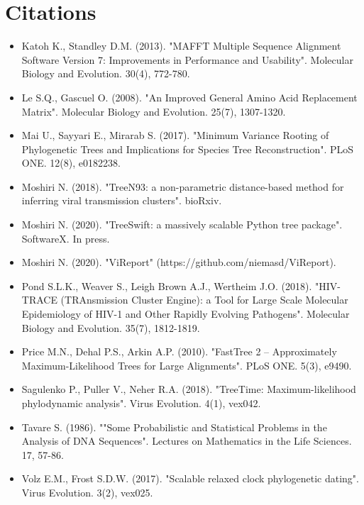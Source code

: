 \documentclass{article}
\begin{document}
\section{Citations}
\begin{itemize}
\item Katoh K., Standley D.M. (2013). "MAFFT Multiple Sequence Alignment Software Version 7: Improvements in Performance and Usability". Molecular Biology and Evolution. 30(4), 772-780.\item Le S.Q., Gascuel O. (2008). "An Improved General Amino Acid Replacement Matrix". Molecular Biology and Evolution. 25(7), 1307-1320.\item Mai U., Sayyari E., Mirarab S. (2017). "Minimum Variance Rooting of Phylogenetic Trees and Implications for Species Tree Reconstruction". PLoS ONE. 12(8), e0182238.\item Moshiri N. (2018). "TreeN93: a non-parametric distance-based method for inferring viral transmission clusters". bioRxiv.\item Moshiri N. (2020). "TreeSwift: a massively scalable Python tree package". SoftwareX. In press.\item Moshiri N. (2020). "ViReport" (https://github.com/niemasd/ViReport).\item Pond S.L.K., Weaver S., Leigh Brown A.J., Wertheim J.O. (2018). "HIV-TRACE (TRAnsmission Cluster Engine): a Tool for Large Scale Molecular Epidemiology of HIV-1 and Other Rapidly Evolving Pathogens". Molecular Biology and Evolution. 35(7), 1812-1819.\item Price M.N., Dehal P.S., Arkin A.P. (2010). "FastTree 2 -- Approximately Maximum-Likelihood Trees for Large Alignments". PLoS ONE. 5(3), e9490.\item Sagulenko P., Puller V., Neher R.A. (2018). "TreeTime: Maximum-likelihood phylodynamic analysis". Virus Evolution. 4(1), vex042.\item Tavare S. (1986). ""Some Probabilistic and Statistical Problems in the Analysis of DNA Sequences". Lectures on Mathematics in the Life Sciences. 17, 57-86.\item Volz E.M., Frost S.D.W. (2017). "Scalable relaxed clock phylogenetic dating". Virus Evolution. 3(2), vex025.\end{itemize}
\end{document}
